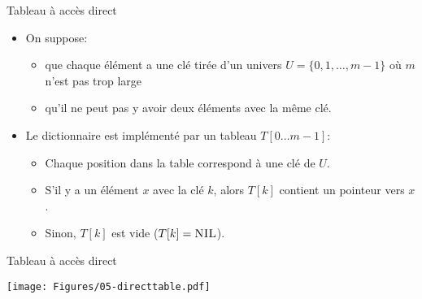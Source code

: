 \begin{frame}{Tableau à accès direct}

\begin{itemize}
\item On suppose:
\begin{itemize}
\item que chaque élément a une clé tirée d'un univers $U=\{0,1,\ldots,m-1\}$ où $m$ n'est pas trop large
\item qu'il ne peut pas y avoir deux éléments avec la même clé.
\end{itemize}
\item Le dictionnaire est implémenté par un tableau $T[0\ldots m-1]$:
\begin{itemize}
\item Chaque position dans la table correspond à une clé de $U$.
\item S'il y a un élément $x$ avec la clé $k$, alors $T[k]$ contient un pointeur vers $x$.
\item Sinon, $T[k]$ est vide ($T[k]=\textnormal{\scshape NIL}$).
\end{itemize}
\end{itemize}

\end{frame}

\begin{frame}{Tableau à accès direct}

\centerline{\texttt{[image: Figures/05-directtable.pdf]}}

\begin{center}
\begin{small}


\end{small}
\end{center}


\end{frame}

